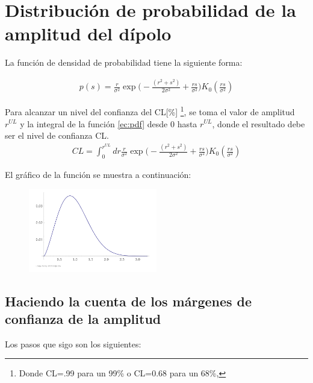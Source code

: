 \documentclass[11pt,papel,oneside,singlespace]{ibtesis}
\begin{document}
\section{Distribución de probabilidad de la amplitud del dípolo}

La función de densidad de probabilidad tiene la siguiente forma:

\begin{align}
    p(s) =\frac{r}{\sigma^2}\exp{\Big( -\frac{(r^2+s^2)}{2\sigma^2} + \frac{rs}{\sigma^2}\Big)}K_0(\frac{rs}{\sigma^2})    \label{ec:pdf}
\end{align}    

Para alcanzar un  nivel del confianza  del  CL[\%] \footnote{ Donde CL=.99 para un 99\% o CL=0.68 para un 68\%,},  se toma el valor de amplitud $r^{UL}$ y la integral de la función \ref{ec:pdf} desde 0 hasta $r^{UL}$, donde el resultado debe ser el nivel de confianza CL.
\begin{align}
    CL = \int_{0}^{r^{UL}} dr \frac{r}{\sigma^2}\exp{\Big( -\frac{(r^2+s^2)}{2\sigma^2} + \frac{rs}{\sigma^2}\Big)}K_0(\frac{rs}{\sigma^2})
    \label{ec:integral}
\end{align}

El gráfico de la función se muestra a continuación:

\begin{figure}[H]
    \begin{small}
        \begin{center}
            \includegraphics[width=0.5\textwidth]{bessel.png}
        \end{center}
        \caption{}
    \end{small}
\end{figure}


\subsection{Haciendo la cuenta de los márgenes de confianza de la amplitud}

Los pasos que sigo son los siguientes: 
\end{document}
